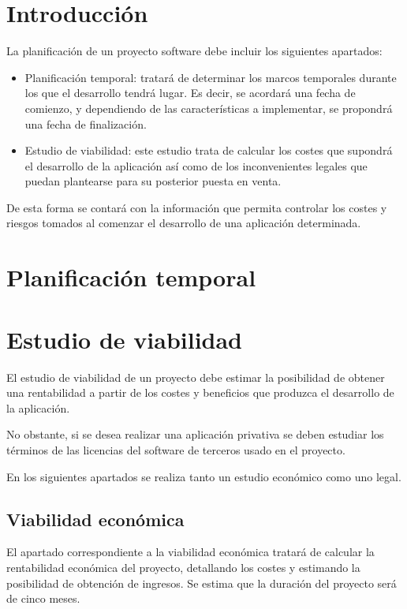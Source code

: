 
\section{Introducción}

La planificación de un proyecto software debe incluir los siguientes apartados:

\begin{itemize}
	\item Planificación temporal: tratará de determinar los marcos temporales durante los que el desarrollo tendrá lugar. Es decir, se acordará una fecha de comienzo, y dependiendo de las características a implementar, se propondrá una fecha de finalización. 
	\item Estudio de viabilidad: este estudio trata de calcular los costes que supondrá el desarrollo de la aplicación así como de los inconvenientes legales que puedan plantearse para su posterior puesta en venta.
\end{itemize}

De esta forma se contará con la información que permita controlar los costes y riesgos tomados al comenzar el desarrollo de una aplicación determinada.

\section{Planificación temporal}



\section{Estudio de viabilidad}
El estudio de viabilidad de un proyecto debe estimar la posibilidad de obtener una rentabilidad a partir de los costes y beneficios que produzca el desarrollo de la aplicación.

No obstante, si se desea realizar una aplicación privativa se deben estudiar los términos de las licencias del software de terceros usado en el proyecto.

En los siguientes apartados se realiza tanto un estudio económico como uno legal.

\subsection{Viabilidad económica}
El apartado correspondiente a la viabilidad económica tratará de calcular la rentabilidad económica del proyecto, detallando los costes y estimando la posibilidad de obtención de ingresos. Se estima que la duración del proyecto será de cinco meses.

